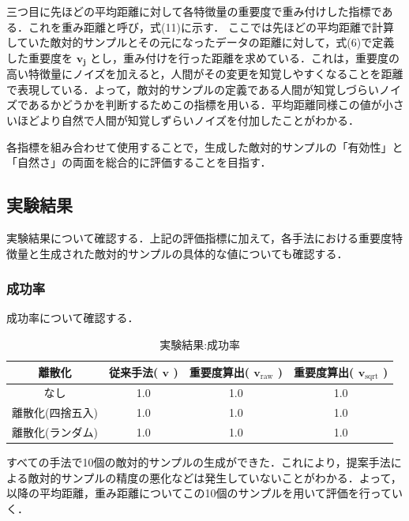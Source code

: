三つ目に先ほどの平均距離に対して各特徴量の重要度で重み付けした指標である．これを重み距離と呼び，式(11)に示す．
ここでは先ほどの平均距離で計算していた敵対的サンプルとその元になったデータの距離に対して，式(6)で定義した重要度を $\bm{v_j}$ とし，重み付けを行った距離を求めている．これは，重要度の高い特徴量にノイズを加えると，人間がその変更を知覚しやすくなることを距離で表現している．よって，敵対的サンプルの定義である人間が知覚しづらいノイズであるかどうかを判断するためこの指標を用いる．平均距離同様この値が小さいほどより自然で人間が知覚しずらいノイズを付加したことがわかる．

各指標を組み合わせて使用することで，生成した敵対的サンプルの「有効性」と「自然さ」の両面を総合的に評価することを目指す．

\subsection{実験結果}
実験結果について確認する．上記の評価指標に加えて，各手法における重要度特徴量と生成された敵対的サンプルの具体的な値についても確認する．

\subsubsection{成功率}
成功率について確認する．
\begin{table}[H]
    \centering
    \caption{実験結果:成功率}
    \begin{tabular}{|c|c|c|c|} \hline
        離散化 & 従来手法( $\bm{v}$ ) & 重要度算出( $\bm{v}_{\mathrm{raw}}$ ) & 重要度算出( $\bm{v}_{\mathrm{sqrt}}$ ) \\ \hline
        なし & 1.0 & 1.0 & 1.0 \\ \hline
        離散化(四捨五入) & 1.0 & 1.0 & 1.0 \\ \hline
        離散化(ランダム) & 1.0 & 1.0 & 1.0 \\ \hline
    \end{tabular}
\end{table}
すべての手法で10個の敵対的サンプルの生成ができた．これにより，提案手法による敵対的サンプルの精度の悪化などは発生していないことがわかる．よって，以降の平均距離，重み距離についてこの10個のサンプルを用いて評価を行っていく．

